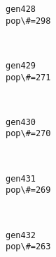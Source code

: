\documentclass[11pt]{article}
\begin{document}
    \begin{Verbatim}[commandchars=\\\{\}]
gen428
pop\#=298

    \end{Verbatim}

    \begin{center}
    \end{center}
    { \hspace*{\fill} \\}
    
    \begin{Verbatim}[commandchars=\\\{\}]
gen429
pop\#=271

    \end{Verbatim}

    \begin{center}
    \end{center}
    { \hspace*{\fill} \\}
    
    \begin{Verbatim}[commandchars=\\\{\}]
gen430
pop\#=270

    \end{Verbatim}

    \begin{center}
    \end{center}
    { \hspace*{\fill} \\}
    
    \begin{Verbatim}[commandchars=\\\{\}]
gen431
pop\#=269

    \end{Verbatim}

    \begin{center}
    \end{center}
    { \hspace*{\fill} \\}
    
    \begin{Verbatim}[commandchars=\\\{\}]
gen432
pop\#=263

    \end{Verbatim}
\end{document}
